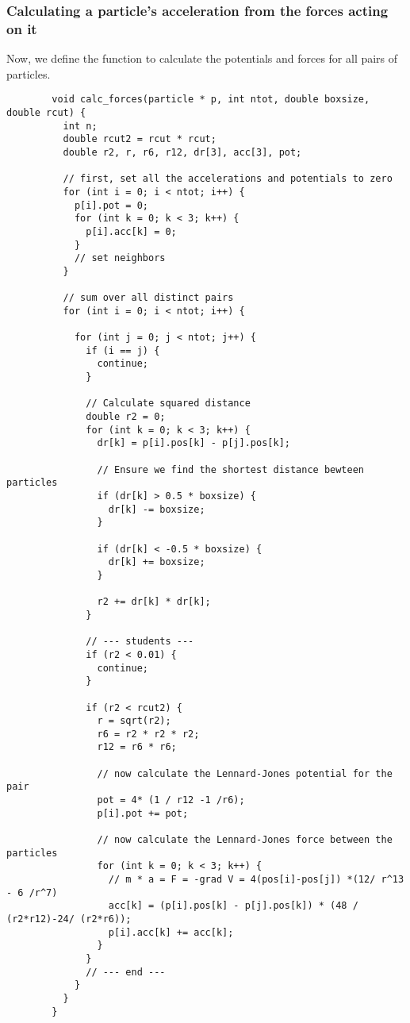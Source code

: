 \subsubsection{Calculating a particle's acceleration from the 
    forces acting on it
}
    Now, we define the function to calculate the potentials and forces for all 
    pairs of particles. \\
    \begin{lstlisting}
        void calc_forces(particle * p, int ntot, double boxsize, double rcut) {
          int n;
          double rcut2 = rcut * rcut;
          double r2, r, r6, r12, dr[3], acc[3], pot;
        
          // first, set all the accelerations and potentials to zero
          for (int i = 0; i < ntot; i++) {
            p[i].pot = 0;
            for (int k = 0; k < 3; k++) {
              p[i].acc[k] = 0;
            }
            // set neighbors
          }
        
          // sum over all distinct pairs
          for (int i = 0; i < ntot; i++) {

            for (int j = 0; j < ntot; j++) {
              if (i == j) {
                continue;
              }
        
              // Calculate squared distance
              double r2 = 0;
              for (int k = 0; k < 3; k++) {
                dr[k] = p[i].pos[k] - p[j].pos[k];
        
                // Ensure we find the shortest distance bewteen particles
                if (dr[k] > 0.5 * boxsize) {
                  dr[k] -= boxsize;
                }
        
                if (dr[k] < -0.5 * boxsize) {
                  dr[k] += boxsize;
                }
        
                r2 += dr[k] * dr[k];
              }
        
              // --- students ---
              if (r2 < 0.01) {
                continue;
              }
        
              if (r2 < rcut2) {
                r = sqrt(r2);
                r6 = r2 * r2 * r2;
                r12 = r6 * r6;
        
                // now calculate the Lennard-Jones potential for the pair
                pot = 4* (1 / r12 -1 /r6);
                p[i].pot += pot;
        
                // now calculate the Lennard-Jones force between the particles
                for (int k = 0; k < 3; k++) {
                  // m * a = F = -grad V = 4(pos[i]-pos[j]) *(12/ r^13 - 6 /r^7)
                  acc[k] = (p[i].pos[k] - p[j].pos[k]) * (48 / (r2*r12)-24/ (r2*r6));
                  p[i].acc[k] += acc[k];
                }
              }
              // --- end ---
            }
          }
        }\end{lstlisting}

